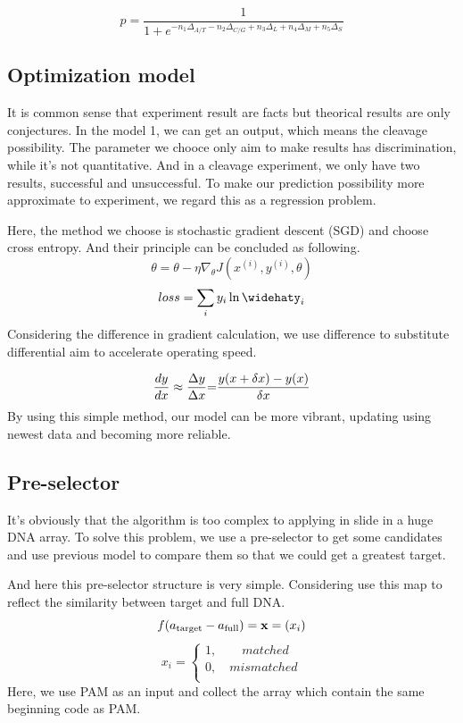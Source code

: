 \documentclass[a4paper,10pt]{article}
\begin{document}
	$$
	p=\frac{1}{1+e^{-n_1\Delta_{A/T}-n_2\Delta_{C/G}+n_3\Delta_{L}+n_4\Delta_{M}+n_5\Delta_{S}}}
	$$
	\subsection{Optimization model}
	It is common sense that experiment result are facts but theorical results are only conjectures. In the model 1, we can get an output, which means the cleavage possibility. The parameter we chooce only aim to make results has discrimination, while it’s not quantitative. And in a cleavage experiment, we only have two results, successful and unsuccessful. To make our prediction possibility more approximate to experiment, we regard this as a regression problem.\par
	Here, the method we choose is stochastic gradient descent (SGD) and choose cross entropy. And their principle can be concluded as following.
	\[\theta  = \theta  - \eta {\nabla _\theta }J({x^{(i)}},{y^{(i)}},\theta )\]
	\[loss = \sum\limits_i {{y_i}\ln {{\widehaty}_i}}\]
	Considering the difference in gradient calculation, we use difference to substitute differential aim to accelerate operating speed.\par
	\[\frac{{dy}}{{dx}} \approx \frac{{\Delta y}}{{\Delta x}}{\rm{ = }}\frac{{y(x + \delta x) - y(x)}}{{\delta x}}\]
	By using this simple method, our model can be more vibrant, updating using newest data and becoming more reliable.
	\subsection{Pre-selector}
	It’s obviously that the algorithm is too complex to applying in slide in a huge DNA array. To solve this problem, we use a pre-selector to get some candidates and use previous model to compare them so that we could get a greatest target.\par
	And here this pre-selector structure is very simple.
	Considering use this map to reflect the similarity between target and full DNA.
	\[f({a_{{\rm{target}}}} - {a_{{\rm{full}}}}) = {\bf{x}} = ({x_i})\]
	\[{x_i} = \left\{ {\begin{array}{*{20}{c}}
		{1,\quad \quad matched}  \\
		{0,\quad mismatched}  \\
		\end{array}} \right.\]
	Here, we use PAM as an input and collect the array which contain the same beginning code as PAM.
\end{document}
